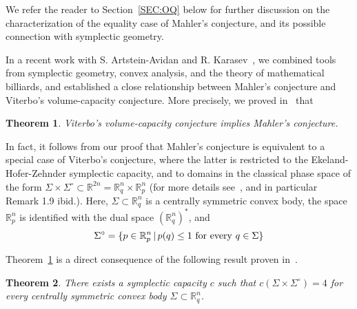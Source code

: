 \documentclass{icmart}
\newtheorem{theorem}{Theorem}[section]
\theoremstyle{definition}
\begin{document}

\smallskip

We refer the reader to  Section~\ref{SEC:OQ} below for further discussion on the characterization of the equality case of Mahler's conjecture,  and its possible connection with symplectic geometry.

\smallskip

In a recent work with S. Artstein-Avidan and R. Karasev~\cite{AKO}, we combined  tools from symplectic geometry, convex analysis, and the theory of mathematical billiards, and  established a close relationship between 
Mahler's conjecture and Viterbo's volume-capacity conjecture. More precisely, we proved in~\cite{AKO} that
\begin{theorem} \label{THM-V-M} Viterbo's volume-capacity conjecture implies Mahler's conjecture.
\end{theorem}
In fact, it follows from our proof that Mahler's conjecture is  equivalent to a special case of Viterbo's  conjecture, where the latter is restricted to the Ekeland-Hofer-Zehnder symplectic capacity, and to domains in the classical phase space of the form $\Sigma \times \Sigma^{\circ} \subset {\mathbb R}^{2n} = {\mathbb R}^n_q \times {\mathbb R}^n_p$   (for more details see~\cite{AKO}, and in particular Remark 1.9 ibid.). Here, $\Sigma \subset {\mathbb R}^n_q$ is a centrally symmetric convex body, the space ${\mathbb R}^n_p$ is identified with the dual space $({\mathbb R}^n_q)^*$, and $$\Sigma^{\circ} = \{ p \in  {\mathbb R}^n_p \, | \, p(q)\leq 1 \ {\rm for \ every } \ q \in \Sigma 
 \}$$  
 
 





Theorem~\ref{THM-V-M} is a direct consequence of %
the following result proven in~\cite{AKO}.

\begin{theorem} \label{THM:CAP=4} There exists a symplectic capacity $c$  such that $ c(\Sigma \times \Sigma^{\circ})=4$ for every centrally symmetric convex body $\Sigma \subset {\mathbb R}^n_q$.
\end{theorem}
\end{document}
